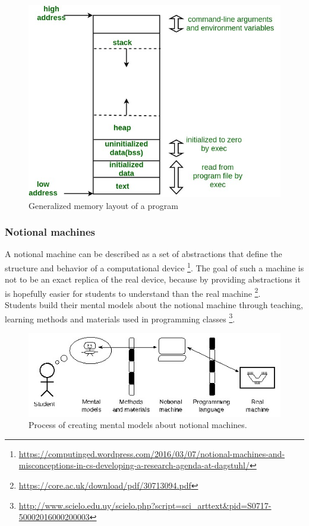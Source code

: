 \documentclass[]{usiinfbachelorproject}
\begin{document}
\begin{figure}[h!]
\includegraphics[scale=0.4]{figures/memory_layout.jpg}
\centering
\caption {Generalized memory layout of a program}
\end{figure}
 
\subsubsection{Notional machines}

A notional machine can be described as a set of abstractions that define the structure and behavior of a computational device \footnote{\url{https://computinged.wordpress.com/2016/03/07/notional-machines-and-misconceptions-in-cs-developing-a-research-agenda-at-dagstuhl/}}. The goal of such a machine is not to be an exact replica of the real device, because by providing abstractions it is hopefully easier for students to understand than the real machine \footnote{\url{https://core.ac.uk/download/pdf/30713094.pdf}}.\\
\noindent Students build their mental models about the notional machine through teaching, learning methods and materials used in programming classes \footnote{\url{http://www.scielo.edu.uy/scielo.php?script=sci_arttext&pid=S0717-50002016000200003}}.
 
\begin{figure}[h!]
\includegraphics[scale=0.8]{figures/notional_machine.jpg}
\centering
\caption {Process of creating mental models about notional machines.}
\end{figure}
 
\end{document}
